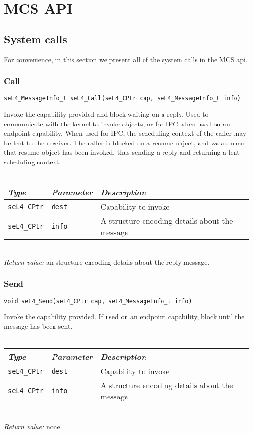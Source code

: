 
\chapter{MCS API}
\label{appendix:api}

\newcommand{\apidoc}[6]
{
    \subsection{\label{api:#1}#2}
    \texttt{#4}

    \noindent
    #3\\
    \vspace{3pt}\\
    \begin{tabularx}{\textwidth}{llX}\toprule
        \emph{Type} & \emph{Parameter} & \emph{Description} \\\midrule
         #5
        \bottomrule
    \end{tabularx}
    \vspace{3pt}\\
    \noindent
    \textit{Return value:} #6 
}

\newcommand{\param}[3]
{
\texttt{#1} & \texttt{#2} & #3 \\
}
\section{System calls}

For convenience, in this section we present all of the system calls in the MCS api.

\apidoc{call}
{Call}
{Invoke the capability provided and block waiting on a reply. Used to communicate with the kernel 
 to invoke objects, or for \gls{IPC} when used on an endpoint capability. When used for \gls{IPC}, 
  the scheduling context of the caller may be lent to the receiver. The caller is blocked on a
  resume object, and wakes once that resume object has been invoked, thus sending a reply and
  returning a lent scheduling context.}
  {seL4_MessageInfo_t seL4_Call(seL4_CPtr cap, seL4_MessageInfo_t info)}
{
    \param{seL4\_CPtr}{dest}{Capability to invoke}
    \param{seL4\_CPtr}{info}{A \code{seL4\_MessageInfo\_t} structure encoding details about the message}
}
{an \code{seL4\_MessageInfo\_t} structure encoding details about the reply message.}

\apidoc{send}
{Send}
{Invoke the capability provided. If used on an endpoint capability, block until the message has been
sent.}
{void seL4_Send(seL4_CPtr cap, seL4_MessageInfo_t info)}
{
    \param{seL4\_CPtr}{dest}{Capability to invoke}
    \param{seL4\_CPtr}{info}{A \code{seL4\_MessageInfo\_t} structure encoding details about the message}
}
{none.}

